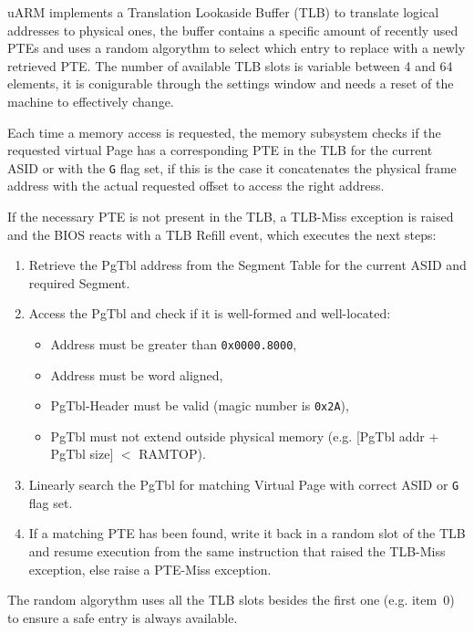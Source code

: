

\vspace{10px}

uARM implements a Translation Lookaside Buffer (TLB) to translate logical addresses to physical ones, the buffer contains a specific amount of recently used PTEs and uses a random algorythm to select which entry to replace with a newly retrieved PTE.
The number of available TLB slots is variable between 4 and 64 elements, it is conigurable through the settings window and needs a reset of the machine to effectively change.

Each time a memory access is requested, the memory subsystem checks if the requested virtual Page has a corresponding PTE in the TLB for the current ASID or with the \texttt{G} flag set, if this is the case it concatenates the physical frame address with the actual requested offset to access the right address.

If the necessary PTE is not present in the TLB, a TLB-Miss exception is raised and the BIOS reacts with a TLB Refill event, which executes the next steps:
\begin{enumerate}
\item Retrieve the PgTbl address from the Segment Table for the current ASID and required Segment.
\item Access the PgTbl and check if it is well-formed and well-located:
	\begin{itemize}
	\item Address must be greater than \texttt{0x0000.8000},
	\item Address must be word aligned,
	\item PgTbl-Header must be valid (magic number is \texttt{0x2A}),
	\item PgTbl must not extend outside physical memory (e.g. [PgTbl addr + PgTbl size] $<$ RAMTOP).
	\end{itemize}
\item Linearly search the PgTbl for matching Virtual Page with correct ASID or \texttt{G} flag set.
\item If a matching PTE has been found, write it back in a random slot of the TLB and resume execution from the same instruction that raised the TLB-Miss exception, else raise a PTE-Miss exception.
\end{enumerate}

The random algorythm uses all the TLB slots besides the first one (e.g. item~0) to ensure a safe entry is always available.
